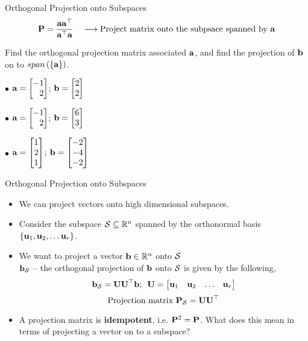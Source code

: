\documentclass[aspectratio=169]{beamer}
\let\olditem\item
\renewcommand{\item}{\setlength{\itemsep}{\fill}\olditem}
\def\mf{\ensuremath\mathbf}
\def\mb{\ensuremath\mathbb}
\def\mc{\ensuremath\mathcal}
\def\lp{\ensuremath\left(}
\def\rp{\ensuremath\right)}
\begin{document}
\begin{frame}[t]{Orthogonal Projection onto Subspaces}
\[ \mf{P} = \frac{\mf{aa}^\top}{\mf{a}^\top\mf{a}} \quad \longrightarrow \text{Project matrix onto the subpsace spanned by } \mf{a} \]

Find the orthogonal projection matrix associated $\mf{a}$, and find the projection of $\mf{b}$ on to $span \lp\left\{\mf{a}\right\}\rp$.\vspace{0.2cm}

$\bullet$ $\mf{a} = \begin{bmatrix*}[r]-1\\2\end{bmatrix*}$;  $\mf{b} = \begin{bmatrix*}[r]2\\2\end{bmatrix*}$

$\bullet$ $\mf{a} = \begin{bmatrix*}[r]-1\\2\end{bmatrix*}$;  $\mf{b} = \begin{bmatrix*}[r]6\\3\end{bmatrix*}$

$\bullet$ $\mf{a} = \begin{bmatrix*}[r]1\\2\\1\end{bmatrix*}$;  $\mf{b} = \begin{bmatrix*}[r]-2\\-4\\-2\end{bmatrix*}$
\end{frame}


\begin{frame}[t]{Orthogonal Projection onto Subspaces}
\begin{itemize}
    \item We can project vectors onto high dimensional subspaces.
    \item Consider the subspace $\mc{S} \subseteq \mb{R}^n$ spanned by the orthonormal basis $\left\{\mf{u}_1, \mf{u}_2, \ldots \mf{u}_r\right\}$.\\

    \item We want to project a vector $\mf{b} \in\mb{R}^n$ onto $\mc{S}$ \\
    $\mf{b}_{\mc{S}}$ -- the orthogonal projection of $\mf{b}$ onto $\mc{S}$ is given by the following,
    \[ \mf{b}_{\mc{S}} = \mf{UU}^\top\mf{b}; \,\,\, \mf{U} = \begin{bmatrix}\mf{u}_1 & \mf{u}_2 & \ldots & \mf{u}_r \end{bmatrix} \]
    \[ \text{Projection matrix } \mf{P}_{\mc{S}} = \mf{UU}^\top \]
    \item A projection matrix is \textbf{idempotent}, i.e. $\mf{P}^2 = \mf{P}$. What does this mean in terms of projecting a vector on to a subspace?
\end{itemize}

\end{frame}
\end{document}
